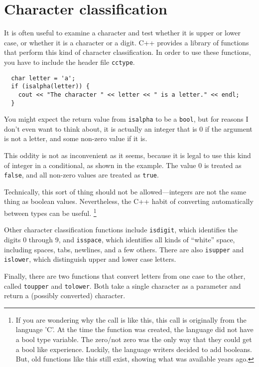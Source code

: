\section{Character classification}

It is often useful to examine a character and test whether
it is upper or lower case, or whether it is a character or
a digit.  C++ provides a library of functions that perform
this kind of character classification.  In order to use these
functions, you have to include the header file {\tt cctype}.

\begin{verbatim}
  char letter = 'a';
  if (isalpha(letter)) {
    cout << "The character " << letter << " is a letter." << endl;
  }
\end{verbatim}
%
You might expect the return value from {\tt isalpha} to
be a {\tt bool}, but for reasons I don't even want to think
about, it is actually an integer that is
0 if the argument is not a letter, and some non-zero value
if it is.

This oddity is not as inconvenient as it seems, because it is
legal to use this kind of integer in a conditional, as shown
in the example.  The value 0 is treated as {\tt false}, and
all non-zero values are treated as {\tt true}.

Technically, this sort of thing should not be allowed---integers are
not the same thing as boolean values.  Nevertheless, the C++ habit of
converting automatically between types can be useful. \footnote{If you are wondering why the call is like this, this call is originally from the language 'C'. At the time the function was created, the language did not have a bool type variable. The zero/not zero was the only way that they could get a bool like experience. Luckily, the language writers decided to add booleans. But, old functions like this still exist, showing what was available years ago.}

Other character classification functions include {\tt isdigit}, which
identifies the digits 0 through 9, and {\tt isspace}, which identifies
all kinds of ``white'' space, including spaces, tabs, newlines, and a
few others.  There are also {\tt isupper} and {\tt islower}, which
distinguish upper and lower case letters.

Finally, there are two functions that convert letters from one
case to the other, called {\tt toupper} and {\tt tolower}.  Both take
a single character as a parameter and return a (possibly
converted) character.


